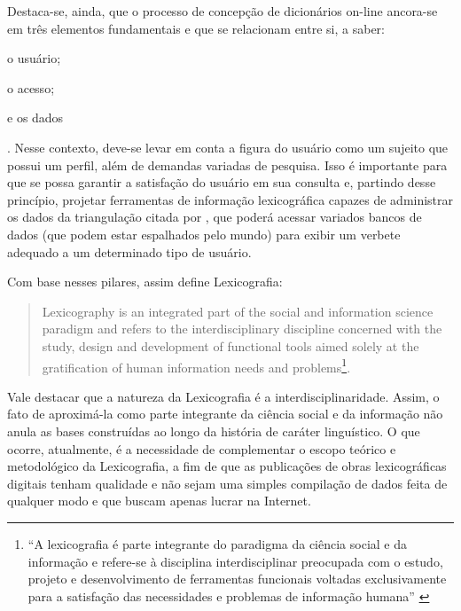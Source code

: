 \documentclass[portuguese]{textolivre}
\begin{document}
Destaca-se, ainda, que o processo de concepção de dicionários on-line ancora-se em três elementos fundamentais e que se relacionam entre si, a saber: 
\begin{enumerate*}[label=\roman*)]
\item o usuário; 
\item o acesso; 
\item e os dados
\end{enumerate*}
\cite[p. 128]{leroyer2011}. Nesse contexto, deve-se levar em conta a figura do usuário como um sujeito que possui um perfil, além de demandas variadas de pesquisa. Isso é importante para que se possa garantir a satisfação do usuário em sua consulta e, partindo desse princípio, projetar ferramentas de informação lexicográfica capazes de administrar os dados da triangulação citada por \textcite[p. 128]{leroyer2011}, que poderá acessar variados bancos de dados (que podem estar espalhados pelo mundo) para exibir um verbete adequado a um determinado tipo de usuário.

Com base nesses pilares, \textcite[p. 129, tradução nossa]{leroyer2011} assim define Lexicografia:
\begin{quote}
    Lexicography is an integrated part of the social and information science paradigm   and refers to the interdisciplinary discipline concerned with the study, design and development of functional tools aimed solely at the gratification of human information needs and problems\footnote{“A lexicografia é parte integrante do paradigma da ciência social e da informação e refere-se à disciplina interdisciplinar preocupada com o estudo, projeto e desenvolvimento de ferramentas funcionais voltadas exclusivamente para a satisfação das necessidades e problemas de informação humana” \cite[p. 129]{leroyer2011}}.
\end{quote}

Vale destacar que a natureza da Lexicografia é a interdisciplinaridade. Assim, o fato de aproximá-la como parte integrante da ciência social e da informação não anula as bases construídas ao longo da história de caráter linguístico. O que ocorre, atualmente, é a necessidade de complementar o escopo teórico e metodológico da Lexicografia, a fim de que as publicações de obras lexicográficas digitais tenham  qualidade e não sejam uma simples compilação de dados feita de qualquer modo e que buscam apenas lucrar na Internet.
\end{document}
